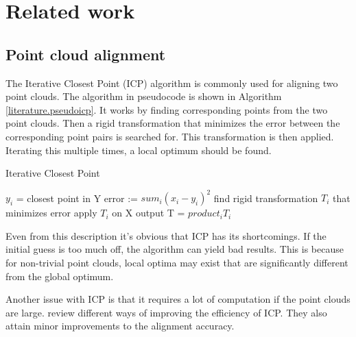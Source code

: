 \chapter{Related work}


\section{Point cloud alignment} \label{literature.alignment}



The Iterative Closest Point (ICP) algorithm is commonly used for aligning two point clouds.  The algorithm in pseudocode is shown in Algorithm \ref{literature.pseudoicp}. It works by finding corresponding points from the two point clouds. Then a rigid transformation that minimizes the error between the corresponding point pairs is searched for. This transformation is then applied. Iterating this multiple times, a local optimum should be found.

\begin{algorithm}
\caption{Iterative Closest Point}
\label{literature.pseudoicp}
\begin{algorithmic}
            \State $y_i$ = closest point in Y
        \EndFor
        \State error := $sum_i (x_i-y_i)^2$
        \State find rigid transformation $T_i$ that minimizes error
        \State apply $T_i$ on X
    \EndFor
    \State \Return output T = $product_i T_i$
\end{algorithmic}
\end{algorithm}

Even from this description it's obvious that ICP has its shortcomings. If the initial guess is too much off, the algorithm can yield bad results. This is because for non-trivial point clouds, local optima may exist that are significantly different from the global optimum.

Another issue with ICP is that it requires a lot of computation if the point clouds are large. \citet{rusinkiewicz2001efficient} review different ways of improving the efficiency of ICP. They also attain minor improvements to the alignment accuracy.

